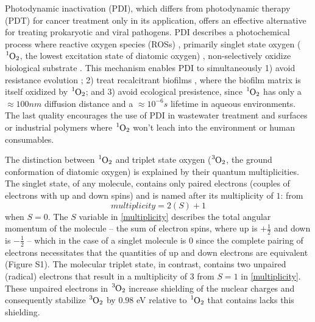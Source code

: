 Photodynamic inactivation (PDI), which differs from photodynamic therapy (PDT) for cancer treatment \cite{Lange2019ComparisonLines} only in its application, offers an effective alternative for treating prokaryotic \cite{Hamblin2004PhotodynamicDisease} and viral \cite{Wigginton2010OxidationInactivation,Lebedeva2020TheViruses} pathogens. PDI describes a photochemical process where reactive oxygen species (ROSs) \cite{Zepp1992HydroxylReaction,Koppenol2001TheLater}, primarily singlet state oxygen ($\ce{^1O2}$, the lowest excitation state of diatomic oxygen) \cite{Ergaieg2008InvolvementPorphyrin, Allen2004IntroductionSimulations, Henze2019Multi-scaleCheckpoint, Zaman2005ComputationalMatrices,Gillespie2007StochasticKinetics}, non-selectively oxidize biological substrate \cite{Choe2006MechanismsOxidation,Frankel1980LipidOxidation}. This mechanism enables PDI to simultaneously 1) avoid resistance evolution \cite{Tavares2010AntimicrobialTreatment,Lauro2002PhotoinactivationConjugates,Pedigo2009AbsenceTherapy}; 2) treat recalcitrant biofilms \cite{Beirao2014PhotodynamicPorphyrin,Ghorbanzadeh2020ModulationModel}, where the biofilm matrix is itself oxidized by $\ce{^1O2}$; and 3) avoid ecological presistence, since $\ce{^1O2}$ has only a $\approx 100 nm$ diffusion distance and a $\approx 10^{-6} s$ lifetime \cite{Moan1984TheOxygen, Moan1990OnTissues,Rodgers1982LifetimeMeasurements} in aqueous environments. The last quality encourages the use of PDI in wastewater treatment \cite{Kohn2007AssociationOxygen,Mostafa2013SingletMatter,Jimenez-Hernandez2006SolarSensitizers} and surfaces \cite{McCoy2014PhotodynamicControl} or industrial polymers \cite{Kim2003DesignProblem} where $\ce{^1O2}$ won't leach into the environment or human consumables. 

The distinction between $\ce{^1O2}$ and triplet state oxygen ($\ce{^3O2}$, the ground conformation of diatomic oxygen) is explained by their quantum multiplicities. The singlet state, of any molecule, contains only paired electrons (couples of electrons with up and down spins) and is named after its multiplicity of $1$: from 
\begin{equation} \label{multiplicity}
    multiplicity = 2(S)+1
\end{equation}
when $S=0$. The $S$ variable in \cref{multiplicity} describes the total angular momentum of the molecule -- the sum of electron spins, where up is $+\frac{1}{2}$ and down is $-\frac{1}{2}$ -- which in the case of a singlet molecule is 0 since the complete pairing of electrons necessitates that the quantities of up and down electrons are equivalent (Figure S1). The molecular triplet state, in contrast, contains two unpaired (radical) electrons that result in a multiplicity of $3$ from $S=1$ in \cref{multiplicity}. These unpaired electrons in $\ce{^3O2}$ increase shielding of the nuclear charges \cite{Katriel1972ARule} and consequently stabilize $\ce{^3O2}$ by $0.98$ eV \cite{Jockusch2008SingletExcitation} relative to $\ce{^1O2}$ that contains lacks this shielding.

